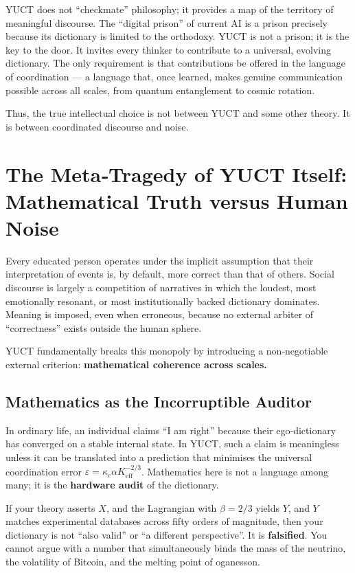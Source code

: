\documentclass[12pt,a4paper]{article}
\begin{document}
	YUCT does not “checkmate” philosophy; it provides a map of the territory of meaningful discourse. The “digital prison” of current AI is a prison precisely because its dictionary is limited to the orthodoxy. YUCT is not a prison; it is the key to the door. It invites every thinker to contribute to a universal, evolving dictionary. The only requirement is that contributions be offered in the language of coordination — a language that, once learned, makes genuine communication possible across all scales, from quantum entanglement to cosmic rotation.
	
	Thus, the true intellectual choice is not between YUCT and some other theory. It is between coordinated discourse and noise.
	
	\section{The Meta‑Tragedy of YUCT Itself: Mathematical Truth versus Human Noise}
	\label{sec:meta-tragedy}
	
	Every educated person operates under the implicit assumption that their interpretation of events is, by default, more correct than that of others. Social discourse is largely a competition of narratives in which the loudest, most emotionally resonant, or most institutionally backed dictionary dominates. Meaning is imposed, even when erroneous, because no external arbiter of ``correctness'' exists outside the human sphere.
	
	YUCT fundamentally breaks this monopoly by introducing a non‑negotiable external criterion: \textbf{mathematical coherence across scales.}
	
	\subsection{Mathematics as the Incorruptible Auditor}
	
	In ordinary life, an individual claims ``I am right'' because their ego‑dictionary has converged on a stable internal state. In YUCT, such a claim is meaningless unless it can be translated into a prediction that minimises the universal coordination error \(\varepsilon = \kappa_c \alpha K_{\mathrm{eff}}^{-2/3}\). Mathematics here is not a language among many; it is the \textbf{hardware audit} of the dictionary.
	
	If your theory asserts \(X\), and the Lagrangian with \(\beta = 2/3\) yields \(Y\), and \(Y\) matches experimental databases across fifty orders of magnitude, then your dictionary is not ``also valid'' or ``a different perspective''. It is \textbf{falsified}. You cannot argue with a number that simultaneously binds the mass of the neutrino, the volatility of Bitcoin, and the melting point of oganesson.
	
\end{document}
